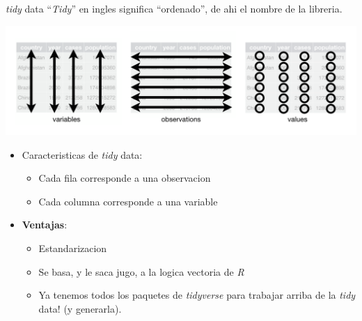 \documentclass[
  10pt,
  ignorenonframetext,
]{beamer}
\providecommand{\tightlist}{%
  \setlength{\itemsep}{0pt}\setlength{\parskip}{0pt}}
\begin{document}
\begin{frame}{\emph{tidy} data}
\protect\hypertarget{tidy-data}{}
``\emph{Tidy}'' en ingles significa ``ordenado'', de ahi el nombre de la
libreria.

\begin{center}\includegraphics{../../imgs/tidy_data_specification} \end{center}

\begin{itemize}
\tightlist
\item
  Caracteristicas de \emph{tidy} data:

  \begin{itemize}
  \tightlist
  \item
    Cada fila corresponde a una observacion
  \item
    Cada columna corresponde a una variable
  \end{itemize}
\item
  \textbf{Ventajas}:

  \begin{itemize}
  \tightlist
  \item
    Estandarizacion
  \item
    Se basa, y le saca jugo, a la logica vectoria de \emph{R}
  \item
    Ya tenemos todos los paquetes de \emph{tidyverse} para trabajar
    arriba de la \emph{tidy} data! (y generarla).
  \end{itemize}
\end{itemize}
\end{frame}
\end{document}
